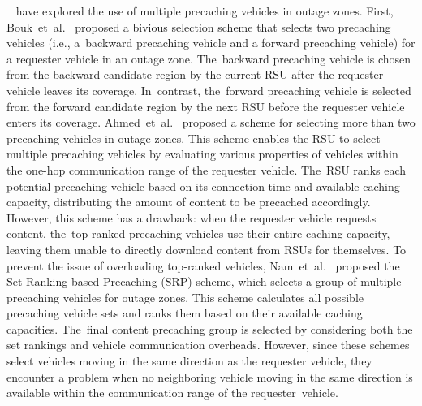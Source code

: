 \documentclass[electronics,aricle,accept,pdftex,moreauthors]{Definitions/mdpi}
\begin{document}
~\mbox{\cite{Bouk2015J, Ahmed2018, Nam2023}} have explored the use of multiple precaching vehicles in outage zones.
First, Bouk~et~al.~\cite{Bouk2015J} proposed a bivious selection scheme that selects two precaching vehicles (i.e., a~backward precaching vehicle and a forward precaching vehicle) for a requester vehicle in an outage zone. The~backward precaching vehicle is chosen from the backward candidate region by the current RSU after the requester vehicle leaves its coverage. In~contrast, the~forward precaching vehicle is selected from the forward candidate region by the next RSU before the requester vehicle enters its coverage.
Ahmed~et~al.~\cite{Ahmed2018} proposed a scheme for selecting more than two precaching vehicles in outage zones. This scheme enables the RSU to select multiple precaching vehicles by evaluating various properties of vehicles within the one-hop communication range of the requester vehicle. The~RSU ranks each potential precaching vehicle based on its connection time and available caching capacity, distributing the amount of content to be precached accordingly. However, this scheme has a drawback: when the requester vehicle requests content, the~top-ranked precaching vehicles use their entire caching capacity, leaving them unable to directly download content from RSUs for themselves.
To prevent the issue of overloading top-ranked vehicles, Nam~et~al.~\cite{Nam2023} proposed the Set Ranking-based Precaching (SRP) scheme, which selects a group of multiple precaching vehicles for outage zones. This scheme calculates all possible precaching vehicle sets and ranks them based on their available caching capacities. The~final content precaching group is selected by considering both the set rankings and vehicle communication overheads.
However, since these schemes select vehicles moving in the same direction as the requester vehicle, they encounter a problem when no neighboring vehicle moving in the same direction is available within the communication range of the requester~vehicle.
\end{document}
